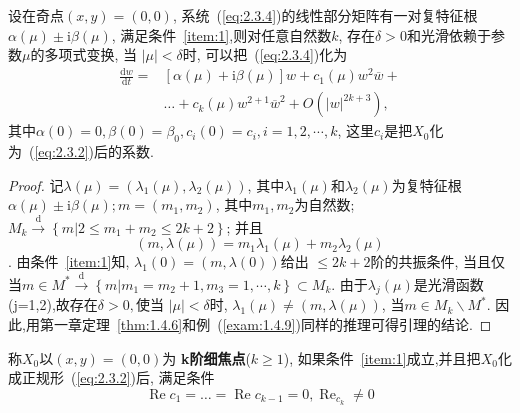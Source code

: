 \begin{corollary}
  \label{corollary:2.3.4}
  设在奇点$(x, y)=(0,0)$,
  系统~(\ref{eq:2.3.4})的线性部分矩阵有一对复特征根
  $\alpha(\mu) \pm \mathrm{i} \beta(\mu)$,
  满足条件~\ref{item:1},则对任意自然数$k$,
  存在$\delta>0$和光滑依赖于参数$\mu$的多项式变换,
  当  $|\mu|<\delta$时,
  可以把~(\ref{eq:2.3.4})化为
  \begin{equation}
    \label{eq:2.3.5}
\begin{aligned}
    \frac{\mathrm{d} w}{\mathrm{d} t}= &[\alpha(\mu)+\mathrm{i} \beta(\mu)] w+c_{1}(\mu) w^{2} \overline{w}+\\
 &   \dots+c_{k}(\mu) w^{2+1} \overline{w}^{2}+O\left(|w|^{2 k+3}\right),
\end{aligned}
\end{equation}
其中$\alpha(0)=0, \beta(0)=\beta_{0}, c_{i}(0)=c_{i}, i=1,2, \cdots, k$,
这里$c_i$是把$X_0$化为~(\ref{eq:2.3.2})后的系数.
\end{corollary}

\begin{proof}
  记$\lambda(\mu)=\left(\lambda_{1}(\mu), \lambda_{2}(\mu)\right)$,
  其中$\lambda_{1}(\mu)$和$\lambda_{2}(\mu)$为复特征根
  $\alpha(\mu) \pm \mathrm{i} \beta(\mu);m=\left(m_{1}, m_{2}\right)$,
  其中$m_{1}, m_{2}$为自然数;
  $M_{k} \stackrel{\mathrm{d}}{\longrightarrow} \left\{m | 2 \leqslant m_{1}+m_{2} \leqslant 2 k+2\right\}$;
  并且
  $$
(m, \lambda(\mu))=m_{1} \lambda_{1}(\mu)+m_{2} \lambda_{2}(\mu)
$$.
由条件~\ref{item:1}知,
$\lambda_{1}(0)=(m, \lambda(0))$给出
$\leqslant 2 k+2$阶的共振条件,
当且仅当$m \in M^{*} \stackrel{\mathrm{d}}{\longrightarrow}\left\{m | m_{1}=m_{2}+1, m_{3}=1, \cdots, k\right\} \subset M_{k}$.
由于$\lambda_{j}(\mu)$是光滑函数(j=1,2),故存在$\delta>0,$使当
$|\mu|<\delta$时,
$\lambda_{1}(\mu) \neq(m, \lambda(\mu))$,
当$m \in M_{k} \backslash M^{*}$.
因此,用第一章定理~\ref{thm:1.4.6}和例~(\ref{exam:1.4.9})同样的推理可得引理的结论.
\end{proof}

\begin{defination}
  \label{def:2.3.5}
  称$X_0$以$(x,y)=(0,0)$为 \textbf{k阶细焦点}($k\geq 1$),
  如果条件~\ref{item:1}成立,并且把$X_0$化成正规形~(\ref{eq:2.3.2})后,
  满足条件
  \begin{equation}
    \label{eq:2.3.6}
\operatorname{Re} c_{1}=\dots=\operatorname{Re} c_{k-1}=0, \operatorname{Re}_{c_{k}} \neq 0
\end{equation}
\end{defination}

